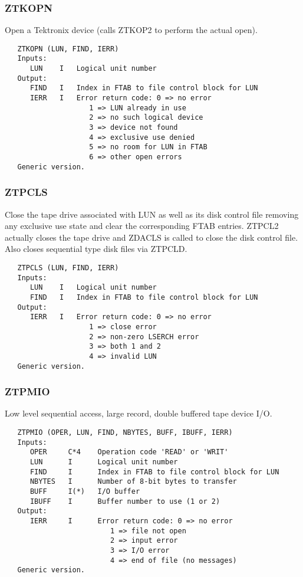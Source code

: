 \subsubsection{ZTKOPN}
Open a Tektronix device (calls ZTKOP2 to perform the actual open).
\begin{verbatim}
   ZTKOPN (LUN, FIND, IERR)
   Inputs:
      LUN    I   Logical unit number
   Output:
      FIND   I   Index in FTAB to file control block for LUN
      IERR   I   Error return code: 0 => no error
                    1 => LUN already in use
                    2 => no such logical device
                    3 => device not found
                    4 => exclusive use denied
                    5 => no room for LUN in FTAB
                    6 => other open errors
   Generic version.
\end{verbatim}

\subsubsection{ZTPCLS}
Close the tape drive associated with LUN as well as its disk control
file removing any exclusive use state and clear the corresponding
FTAB entries.  ZTPCL2 actually closes the tape drive and ZDACLS is
called to close the disk control file.  Also closes sequential type
disk files via ZTPCLD.
\begin{verbatim}
   ZTPCLS (LUN, FIND, IERR)
   Inputs:
      LUN    I   Logical unit number
      FIND   I   Index in FTAB to file control block for LUN
   Output:
      IERR   I   Error return code: 0 => no error
                    1 => close error
                    2 => non-zero LSERCH error
                    3 => both 1 and 2
                    4 => invalid LUN
   Generic version.
\end{verbatim}

\subsubsection{ZTPMIO}
Low level sequential access, large record, double buffered tape
device I/O.
\begin{verbatim}
   ZTPMIO (OPER, LUN, FIND, NBYTES, BUFF, IBUFF, IERR)
   Inputs:
      OPER     C*4    Operation code 'READ' or 'WRIT'
      LUN      I      Logical unit number
      FIND     I      Index in FTAB to file control block for LUN
      NBYTES   I      Number of 8-bit bytes to transfer
      BUFF     I(*)   I/O buffer
      IBUFF    I      Buffer number to use (1 or 2)
   Output:
      IERR     I      Error return code: 0 => no error
                         1 => file not open
                         2 => input error
                         3 => I/O error
                         4 => end of file (no messages)
   Generic version.
\end{verbatim}

